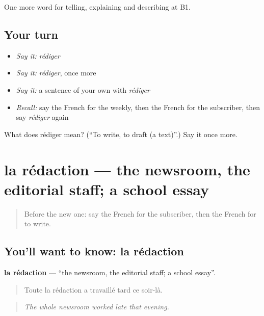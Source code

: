\begin{grammarlens}[title={What you've built}]
One more word for telling, explaining and describing at B1.
\end{grammarlens}

\subsection*{Your turn}
\begin{itemize}
\raggedright
  \item \emph{Say it:} \emph{rédiger}
  \item \emph{Say it:} \emph{rédiger}, once more
  \item \emph{Say it:} a sentence of your own with \emph{rédiger}
  \item \emph{Recall:} say the French for the weekly, then the French for the subscriber, then say \emph{rédiger} again
\end{itemize}

\begin{tcolorbox}[breakable,colback=teal!4,colframe=teal!35!black,title={Before you move on}]
What does rédiger mean? (\textquotedblleft{}To write, to draft (a text)\textquotedblright{}.) Say it once more.
\end{tcolorbox}
\section[la rédaction]{la rédaction — the newsroom, the editorial staff; a school essay}

\label{lesson:FR-C279-redaction}



\begin{quote}
Before the new one: say the French for the subscriber, then the French for to write.
\end{quote}

\subsection*{You'll want to know: la rédaction}
\textbf{la rédaction} — \textquotedblleft{}the newsroom, the editorial staff; a school essay\textquotedblright{}.

\begin{quote}
Toute la rédaction a travaillé tard ce soir-là.
\end{quote}

\begin{quote}
\emph{The whole newsroom worked late that evening.}
\end{quote}

